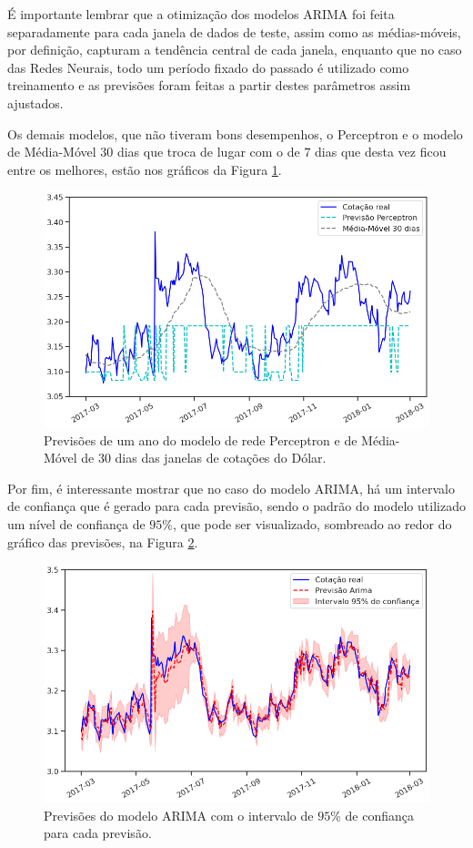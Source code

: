 É importante lembrar que a otimização dos modelos ARIMA foi feita separadamente para cada janela de dados de teste, assim como as médias-móveis, por definição, capturam a tendência central de cada janela, enquanto que no caso das Redes Neurais, todo um período fixado do passado é utilizado como treinamento e as previsões foram feitas a partir destes parâmetros assim ajustados.

Os demais modelos, que não tiveram bons desempenhos, o Perceptron e o modelo de Média-Móvel $30$ dias que troca de lugar com o de $7$ dias que desta vez ficou entre os melhores, estão nos gráficos da Figura \ref{fig:previsoes_ano_2}.

\begin{figure}[htb]
\centering
\includegraphics[width=14cm]{figuras/series_previsoes_ano_2}
\caption{Previsões de um ano do modelo de rede Perceptron e de Média-Móvel de $30$ dias das janelas de cotações do Dólar.}
\label{fig:previsoes_ano_2}
\end{figure}

Por fim, é interessante mostrar que no caso do modelo ARIMA, há um intervalo de confiança que é gerado para cada previsão, sendo o padrão do modelo utilizado um nível de confiança de $95\%$, que pode ser visualizado, sombreado ao redor do gráfico das previsões, na Figura \ref{fig:series_arima_ano}.

\begin{figure}[htb]
\centering
\includegraphics[width=14cm]{figuras/series_arima_ano}
\caption{Previsões do modelo ARIMA com o intervalo de $95\%$ de confiança para cada previsão.}
\label{fig:series_arima_ano}
\end{figure}


